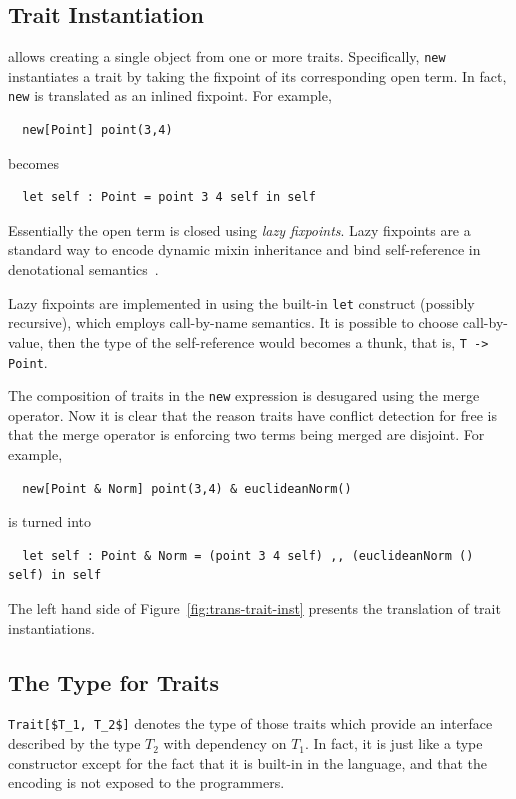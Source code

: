 \subsection{Trait Instantiation}

\name allows creating a single object from one or more traits. Specifically,
\lstinline{new} instantiates a trait by taking the fixpoint of its
corresponding open term. In fact, \lstinline{new} is translated as an inlined
fixpoint. For example,
\begin{lstlisting}
  new[Point] point(3,4)
\end{lstlisting}
becomes
\begin{lstlisting}
  let self : Point = point 3 4 self in self
\end{lstlisting}
Essentially the open term is closed using \textit{lazy fixpoints}. Lazy
fixpoints are a standard way to encode dynamic mixin inheritance and bind
self-reference in denotational semantics~\cite{cook1989denotational}.

Lazy fixpoints are implemented in \name using the built-in \lstinline{let}
construct (possibly recursive), which employs call-by-name semantics. It is
possible to choose call-by-value, then the type of the self-reference would
becomes a thunk, that is, \lstinline$T -> Point$.

The composition of traits in the \lstinline{new} expression is desugared using
the merge operator. Now it is clear that the reason traits have conflict
detection for free is that the merge operator is enforcing two terms being
merged are disjoint. For example,
\begin{lstlisting}
  new[Point & Norm] point(3,4) & euclideanNorm()
\end{lstlisting}
is turned into
\begin{lstlisting}
  let self : Point & Norm = (point 3 4 self) ,, (euclideanNorm () self) in self
\end{lstlisting}

The left hand side of Figure~\ref{fig:trans-trait-inst} presents the translation
of trait instantiations.

\subsection{The Type for Traits}

\lstinline[mathescape=true]{Trait[$T_1, T_2$]} denotes the type of those traits
which provide an interface described by the type $T_2$ with dependency on $T_1$.
In fact, it is just like a type constructor except for the fact that it is
built-in in the language, and that the encoding is not exposed to the
programmers. 

